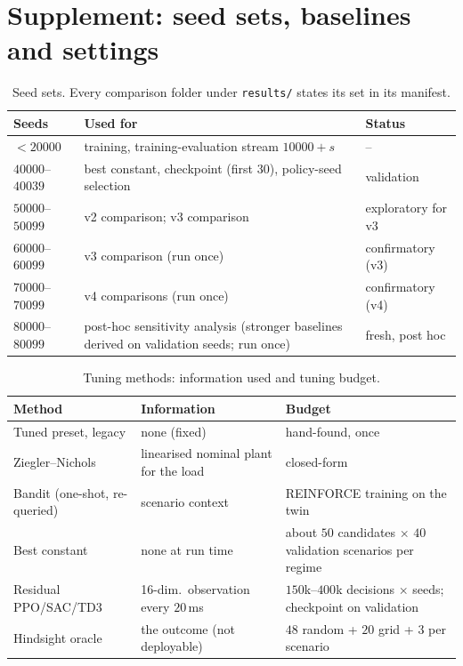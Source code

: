 \section{Supplement: seed sets, baselines and settings}\label{app:supplement}
\begin{table}[t]\centering\small
\caption{Seed sets. Every comparison folder under \texttt{results/} states its set in its manifest.}\label{tab:seedsets}
\begin{tabular}{lll}\toprule
Seeds & Used for & Status\\\midrule
$<20000$ & training, training-evaluation stream $10000+s$ & --\\
$40000$--$40039$ & best constant, checkpoint (first $30$), policy-seed selection & validation\\
$50000$--$50099$ & v2 comparison; v3 comparison & exploratory for v3\\
$60000$--$60099$ & v3 comparison (run once) & confirmatory (v3)\\
$70000$--$70099$ & v4 comparisons (run once) & confirmatory (v4)\\
$80000$--$80099$ & post-hoc sensitivity analysis (stronger baselines derived on validation seeds; run once) & fresh, post hoc\\\bottomrule
\end{tabular}\end{table}

\begin{table}[t]\centering\small
\caption{Tuning methods: information used and tuning budget.}\label{tab:baselines}
\begin{tabular}{p{2.3cm}p{2.7cm}p{2.7cm}}\toprule
Method & Information & Budget\\\midrule
Tuned preset, legacy & none (fixed) & hand-found, once\\
Ziegler--Nichols & linearised nominal plant for the load & closed-form\\
Bandit (one-shot, re-queried) & scenario context & REINFORCE training on the twin\\
Best constant & none at run time & about $50$ candidates $\times$ $40$ validation scenarios per regime\\
Residual PPO/SAC/TD3 & 16-dim.\ observation every $20$\,ms & $150$k--$400$k decisions $\times$ seeds; checkpoint on validation\\
Hindsight oracle & the outcome (not deployable) & $48$ random + $20$ grid + $3$ per scenario\\\bottomrule
\end{tabular}\end{table}

